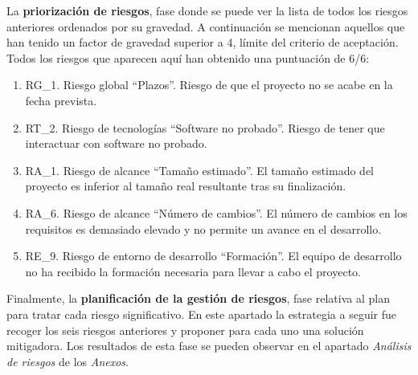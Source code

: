 \par La \textbf{priorización de riesgos}, fase donde se puede ver la lista de todos los riesgos anteriores ordenados por su gravedad. A continuación se mencionan aquellos que han tenido un factor de gravedad superior a 4, límite del criterio de aceptación. Todos los riesgos que aparecen aquí han obtenido una puntuación de 6/6: 
\begin{enumerate}
\item RG\_1. Riesgo global “Plazos”. Riesgo de que el proyecto no se acabe en la fecha prevista. 
\item RT\_2. Riesgo de tecnologías “Software no probado”. Riesgo de tener que interactuar con software no probado. 
\item RA\_1. Riesgo de alcance “Tamaño estimado”.  El tamaño estimado del proyecto es inferior al tamaño real resultante tras su finalización. 
\item RA\_6. Riesgo de alcance “Número de cambios”.  El número de cambios en los requisitos es demasiado elevado y no permite un avance en el desarrollo. 
\item RE\_9. Riesgo de entorno de desarrollo “Formación”. El equipo de desarrollo no ha recibido la formación necesaria para llevar a cabo el proyecto.
\end{enumerate}
\par Finalmente, la \textbf{planificación de la gestión de riesgos}, fase relativa al plan para tratar cada riesgo significativo. En este apartado la estrategia a seguir fue recoger los seis riesgos anteriores y proponer para cada uno una solución mitigadora. Los resultados de esta fase se pueden observar en el apartado \textit{Análisis de riesgos} de los \textit{Anexos}.

